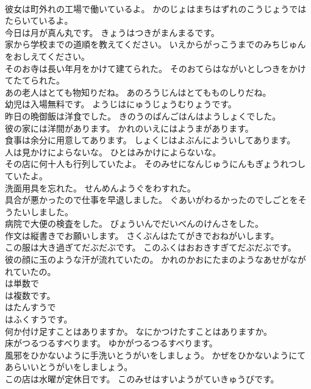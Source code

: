 \documentclass[8pt]{extreport}
\begin{document}
\begin{CJK}{UTF8}{min}
\\	彼女は町外れの工場で働いているよ。	かのじょはまちはずれのこうじょうではたらいているよ。 
\\	今日は月が真ん丸です。	きょうはつきがまんまるです。 
\\	家から学校までの道順を教えてください。	いえからがっこうまでのみちじゅんをおしえてください。 
\\	そのお寺は長い年月をかけて建てられた。	そのおてらはながいとしつきをかけてたてられた。 
\\	あの老人はとても物知りだね。	あのろうじんはとてもものしりだね。 
\\	幼児は入場無料です。	ようじはにゅうじょうむりょうです。 
\\	昨日の晩御飯は洋食でした。	きのうのばんごはんはようしょくでした。 
\\	彼の家には洋間があります。	かれのいえにはようまがあります。 
\\	食事は余分に用意してあります。	しょくじはよぶんによういしてあります。 
\\	人は見かけによらないな。	ひとはみかけによらないな。 
\\	その店に何十人も行列していたよ。	そのみせになんじゅうにんもぎょうれつしていたよ。 
\\	洗面用具を忘れた。	せんめんようぐをわすれた。 
\\	具合が悪かったので仕事を早退しました。	ぐあいがわるかったのでしごとをそうたいしました。 
\\	病院で大便の検査をした。	びょういんでだいべんのけんさをした。 
\\	作文は縦書きでお願いします。	さくぶんはたてがきでおねがいします。 
\\	この服は大き過ぎてだぶだぶです。	このふくはおおきすぎてだぶだぶです。 
\\	彼の顔に玉のような汗が流れていたの。	かれのかおにたまのようなあせがながれていたの。 
\\	は単数で
\\	は複数です。	
\\	はたんすうで
\\	はふくすうです。 
\\	何か付け足すことはありますか。	なにかつけたすことはありますか。 
\\	床がつるつるすべります。	ゆかがつるつるすべります。 
\\	風邪をひかないように手洗いとうがいをしましょう。	かぜをひかないようにてあらいいとうがいをしましょう。 
\\	この店は水曜が定休日です。	このみせはすいようがていきゅうびです。 

\end{CJK}
\end{document}
